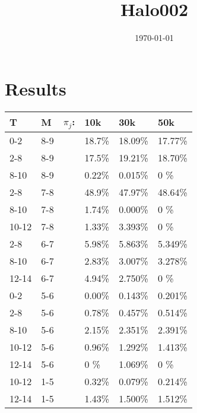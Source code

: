 \documentclass[12pt]{amsart}
\title{Halo002}
\author{\today}
\begin{document}
\maketitle



















\section{Results}
\begin{table}[h]
	\begin{center}
		\begin{tabular}{|l l ||l l| l| l|}
		T	& 	M & $\pi_j$: & 		10k & 		30k & 		50k	\\
		 \hline
		 0-2		&	8-9	&		&	18.7\%	&	 		18.09\%	&			17.77\%	\\                
		 2-8		&	8-9	&		&	17.5\%	&	 		19.21\%	&			18.70\%	\\                
		 8-10 	&	8-9	&		&	0.22\%	&	 		0.015\%	&			0		 \%	\\                
		 2-8		&	7-8	&		&	48.9\%	&	 		47.97\%	&			48.64\%	\\                
		 8-10 	&	7-8	&		&	1.74\%	&	 		0.000\%	&			0		 \%	\\                
		 10-12	&	7-8	&		&	1.33\%	&	 		3.393\%	&			0		 \%	\\                
		 2-8		&	6-7	&		&	5.98\%	&	 		5.863\%	&			5.349\%	\\                
		 8-10 	&	6-7	&		&	2.83\%	&	 		3.007\%	&			3.278\%	\\                
		 12-14	&	6-7	&		&	4.94\%	&	 		2.750\%	&			0		 \%	\\                
		 0-2		&	5-6	&		&	0.00\%	&	 		0.143\%	&			0.201\%	\\                
		 2-8		&	5-6	&		&	0.78\%	&	 		0.457\%	&			0.514\%	\\                
		 8-10 	&	5-6	&		&	2.15\%	&	 		2.351\%	&			2.391\%	\\                
		 10-12	&	5-6	&		&	0.96\%	&	 		1.292\%	&			1.413\%	\\                
		 12-14	&	5-6	&		&	0		\%	&	 		1.069\%	&			0		 \%	\\                
		 10-12	&	1-5	&		&	0.32\%	&	 		0.079\%	&			0.214\%	\\                
		 12-14	&	1-5	&		&	1.43\%	&	 		1.500\%	&			1.512\%	\\      
		\end{tabular}
	\end{center}
\end{table}


\newpage




\end{document}
